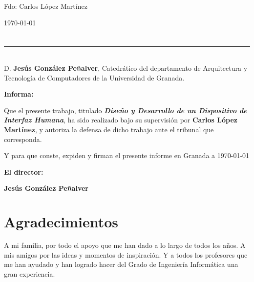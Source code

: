 \vspace{6cm}

\noindent Fdo: Carlos López Martínez

\vspace{2cm}

\begin{flushright}
\today
\end{flushright}


\chapter*{}
\thispagestyle{empty}

\noindent\rule[-1ex]{\textwidth}{2pt}\\[4.5ex]

D. \textbf{Jesús González Peñalver}, Catedrático del departamento de Arquitectura y Tecnología de Computadores de la Universidad de Granada.

\vspace{0.5cm}

\textbf{Informa:}

\vspace{0.5cm}

Que el presente trabajo, titulado \textit{\textbf{Diseño y Desarrollo de un Dispositivo de Interfaz Humana}},
ha sido realizado bajo su supervisión por \textbf{Carlos López Martínez}, y autoriza la defensa de dicho trabajo ante el tribunal
que corresponda.

\vspace{0.5cm}

Y para que conste, expiden y firman el presente informe en Granada a \today

\vspace{1cm}

\textbf{El director:}

\vspace{5cm}

\noindent \textbf{Jesús González Peñalver}

\chapter*{Agradecimientos}
\thispagestyle{empty}

       \vspace{1cm}

A mi familia, por todo el apoyo que me han dado a lo largo de todos
los años. A mis amigos por las ideas y momentos de inspiración. Y a
todos los profesores que me han ayudado y han logrado hacer del Grado de
Ingeniería Informática una gran experiencia.